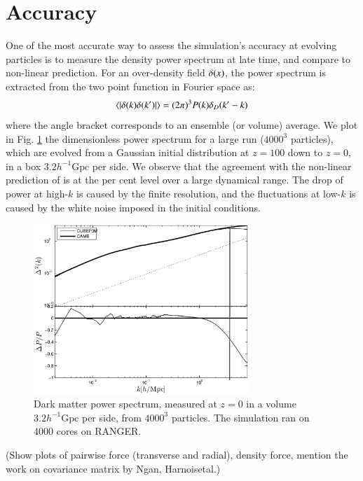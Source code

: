 \section{Accuracy}
\label{sec:accuracy}
 
One of the most accurate way to assess the simulation's accuracy at evolving particles
is to measure the density power spectrum at late time, and compare to non-linear prediction. 
For an over-density field $\delta({\bf \it x})$, the power spectrum is extracted from the two point function in Fourier space as:
\begin{eqnarray}
\langle | \delta ({\bf \it k}) \delta ({\bf \it k'}) | \rangle = (2\pi)^{3}P(k)\delta_{D}({\bf \it k'} - {\bf \it k})
\label{eq:power}
\end{eqnarray}
where the angle bracket corresponds to an ensemble (or volume) average.
We plot in Fig. \ref{fig:power_highres} the dimensionless power spectrum for a large run ($4000^3$ particles),
which are evolved from a Gaussian initial distribution at $z=100$ down to $z=0$, in a box $3.2 h^{-1}\mbox{Gpc}$ per side.
We observe that the agreement with the non-linear prediction of \cite{Lewis} is at the per cent level over a large dynamical range.
The drop of power at high-$k$ is caused by the finite resolution, and the fluctuations at low-$k$ is caused by the white noise imposed
in the initial conditions. 

\begin{figure}%
  \begin{center}
    \includegraphics[width=3.2in]{graphs/power_highres.eps}
  \caption{Dark matter power spectrum, measured at $z=0$ in a volume $3.2 h^{-1}\mbox{Gpc}$ per side,
  from $4000^3$ particles. The simulation ran on 4000 cores on RANGER.
    \label{fig:power_highres}}
\end{center}
\end{figure}

(Show plots of pairwise force (transverse and radial), density force, 
mention the work on covariance matrix by Ngan, Harnoisetal.)


